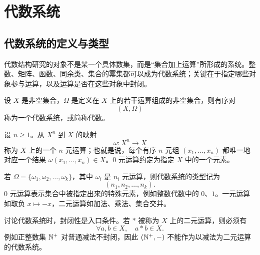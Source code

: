 %
%

\chapter{代数系统}

\section{代数系统的定义与类型}

代数结构研究的对象不是某一个具体数集，而是“集合加上运算”所形成的系统。整数、矩阵、函数、同余类、集合的幂集都可以成为代数系统；关键在于指定哪些对象参与运算，以及运算是否在这些对象中封闭。

\begin{definition}[代数系统]\label{algebra-system}
  设 $X$ 是非空集合，$\Omega$ 是定义在 $X$ 上的若干运算组成的非空集合，则有序对
  \[
  (X,\Omega)
  \]
  称为一个代数系统，或简称代数。
\end{definition}

\begin{definition}[$n$ 元运算]\label{nary-operation}
  设 $n\ge 1$。从 $X^n$ 到 $X$ 的映射
  \[
  \omega:X^n\longrightarrow X
  \]
  称为 $X$ 上的一个 $n$ 元运算；也就是说，每个有序 $n$ 元组
  $(x_1,\ldots,x_n)$ 都唯一地对应一个结果
  $\omega(x_1,\ldots,x_n)\in X$。$0$ 元运算约定为指定 $X$ 中的一个元素。
\end{definition}

若 $\Omega=\{\omega_1,\omega_2,\ldots,\omega_k\}$，其中 $\omega_i$ 是 $n_i$ 元运算，则代数系统的类型记为
\[
(n_1,n_2,\ldots,n_k).
\]
$0$ 元运算表示集合中被指定出来的特殊元素，例如整数代数中的 $0$、$1$。一元运算如取负 $x\mapsto -x$，二元运算如加法、乘法、集合交并。

\begin{pitfall}[运算必须先检查封闭性]\label{closure-first}
  讨论代数系统时，封闭性是入口条件。若 $*$ 被称为 $X$ 上的二元运算，则必须有
  \[
  \forall a,b\in X,\quad a*b\in X.
  \]
  例如正整数集 $\mathbb{N}^+$ 对普通减法不封闭，因此 $(\mathbb{N}^+,-)$ 不能作为以减法为二元运算的代数系统。
\end{pitfall}

